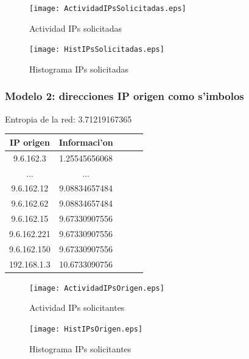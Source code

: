 \documentclass[a4paper,10pt]{article}
\begin{document}
\begin{figure}[!hbp]
\begin{center}
\texttt{[image: ActividadIPsSolicitadas.eps]}
\end{center}
\caption{Actividad IPs solicitadas} \label{figura2}
\end{figure}

\begin{figure}[!hbp]
\begin{center}
\texttt{[image: HistIPsSolicitadas.eps]}
\end{center}
\caption{Histograma IPs solicitadas} \label{figura3}
\end{figure}

\newpage

\subsubsection{Modelo 2: direcciones IP origen como s'imbolos}

Entropia de la red: 3.71219167365	\\

\noindent \begin{tabular}{| c | c | c | c | r} \hline
IP origen	&	Informaci'on	\\	\hline
9.6.162.3	 & 	1.25545656068	 \\ \hline 
...	&	...	\\ \hline
9.6.162.12	 & 	9.08834657484	 \\ \hline 
9.6.162.62	 & 	9.08834657484	 \\ \hline 
9.6.162.15	 & 	9.67330907556	 \\ \hline 
9.6.162.221	 & 	9.67330907556	 \\ \hline 
9.6.162.150	 & 	9.67330907556	 \\ \hline 
192.168.1.3	 & 	10.6733090756	 \\ \hline 
\end{tabular}	

\newpage

\begin{figure}[!hbp]
\begin{center}
\texttt{[image: ActividadIPsOrigen.eps]}
\end{center}
\caption{Actividad IPs solicitantes} \label{figura4}
\end{figure}

\begin{figure}[!hbp]
\begin{center}
\texttt{[image: HistIPsOrigen.eps]}
\end{center}
\caption{Histograma IPs solicitantes} \label{figura5}
\end{figure}
\end{document}
